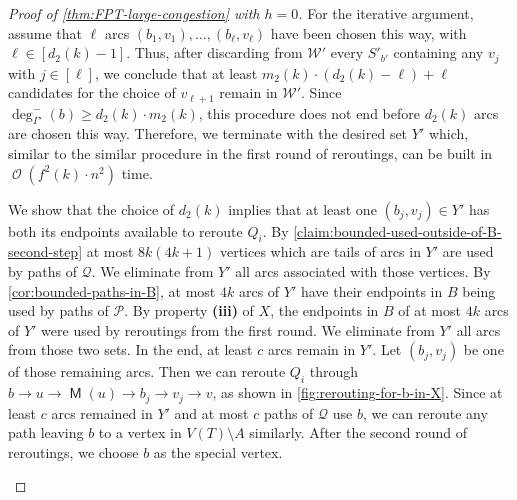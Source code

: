 \documentclass[a4paper,UKenglish,cleveref, autoref, thm-restate]{lipics-v2021}
\newcommand{\lipItem}[1]{\textcolor{lipicsGray}{\sffamily\bfseries\upshape\mathversion{bold}#1}}
\DeclareMathOperator{\Ocal}{\mathcal{O}\xspace}
\DeclareMathOperator{\Mat}{\mathsf M}
\begin{document}
\begin{proof}[Proof of \autoref{thm:FPT-large-congestion} with $h = 0$]
For the iterative argument, assume that $\ell$ arcs $(b_1, v_1), \ldots, (b_{\ell}, v_{\ell})$ have been chosen this way, with $\ell \in [d_2(k) - 1]$.
Thus, after discarding from $\mathcal{W}'$ every $S'_{b'}$ containing any $v_j$ with $j \in [\ell]$, we conclude that at least $m_2(k) \cdot (d_2(k) - \ell) + \ell$ candidates for the choice of $v_{\ell+1}$ remain in $\mathcal{W}'$.
Since $\deg^-_{\Gamma'}(b) \geq d_2(k) \cdot m_2(k)$, this procedure does not end before $d_2(k)$ arcs are chosen this way.
Therefore, we terminate with the desired set $Y'$ which, similar to the similar procedure in the first round of reroutings, can be built in $\Ocal(f^2(k) \cdot n^2)$ time.

We show that the choice of $d_2(k)$ implies that at least one $(b_j, v_j) \in Y'$ has both its endpoints available to reroute $Q_i$.
By \autoref{claim:bounded-used-outside-of-B-second-step} at most $8k(4k+1)$ vertices which are tails of arcs in $Y'$ are used by paths of $\mathcal{Q}$.
We eliminate from $Y'$ all arcs associated with those vertices.
By \autoref{cor:bounded-paths-in-B}, at most $4k$ arcs of $Y'$ have their endpoints in $B$ being used by paths of $\mathcal{P}$.
By property \lipItem{(iii)} of $X$, the endpoints in $B$ of at most $4k$ arcs of $Y'$ were used by reroutings from the first round.
We eliminate from $Y'$ all arcs from those two sets.
In the end, at least $c$ arcs remain in $Y'$.
Let $(b_j, v_j)$ be one of those remaining arcs.
Then we can reroute $Q_i$ through $b \to u \to \Mat(u) \to b_j \to v_j \to v$, as shown in \autoref{fig:rerouting-for-b-in-X}.
Since at least $c$ arcs remained in $Y'$ and at most $c$ paths of $\mathcal{Q}$ use $b$, we can reroute any path leaving $b$ to a vertex in $V(T) \setminus A$  similarly.
After the second round of reroutings, we choose $b$ as the special vertex.

\begin{figure}[h]
  \centering
\end{figure}
\end{proof}
\end{document}

